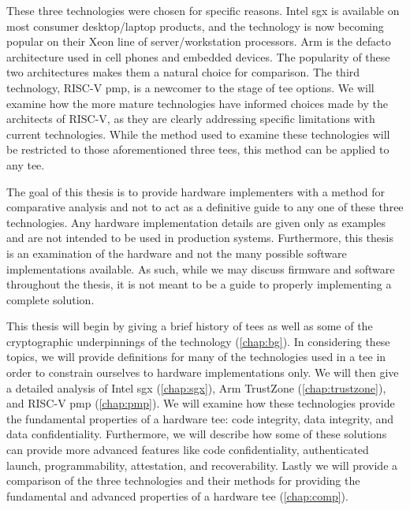 These three technologies were chosen for specific reasons. Intel \gls{sgx} is available on most consumer desktop/laptop products, and the technology is now becoming popular on their Xeon line of server/workstation processors. Arm is the defacto architecture used in cell phones and embedded devices. The popularity of these two architectures makes them a natural choice for comparison. The third technology, RISC-V \gls{pmp}, is a newcomer to the stage of \gls{tee} options. We will examine how the more mature technologies have informed choices made by the architects of RISC-V, as they are clearly addressing specific limitations with current technologies. While the method used to examine these technologies will be restricted to those aforementioned three \glspl{tee}, this method can be applied to any \gls{tee}.

The goal of this thesis is to provide hardware implementers with a method for comparative analysis and not to act as a definitive guide to any one of these three technologies. Any hardware implementation details are given only as examples and are not intended to be used in production systems. Furthermore, this thesis is an examination of the hardware and not the many possible software implementations available. As such, while we may discuss firmware and software throughout the thesis, it is not meant to be a guide to properly implementing a complete solution.

This thesis will begin by giving a brief history of \glspl{tee} as well as some of the cryptographic underpinnings of the technology (\autoref{chap:bg}). In considering these topics, we will provide definitions for many of the technologies used in a \gls{tee} in order to constrain ourselves to hardware implementations only. We will then give a detailed analysis of Intel \gls{sgx} (\autoref{chap:sgx}), Arm TrustZone (\autoref{chap:trustzone}), and RISC-V \gls{pmp} (\autoref{chap:pmp}). We will examine how these technologies provide the fundamental properties of a hardware \gls{tee}: code integrity, data integrity, and data confidentiality. Furthermore, we will describe how some of these solutions can provide more advanced features like code confidentiality, authenticated launch, programmability, attestation, and recoverability. Lastly we will provide a comparison of the three technologies and their methods for providing the fundamental and advanced properties of a hardware \gls{tee} (\autoref{chap:comp}).